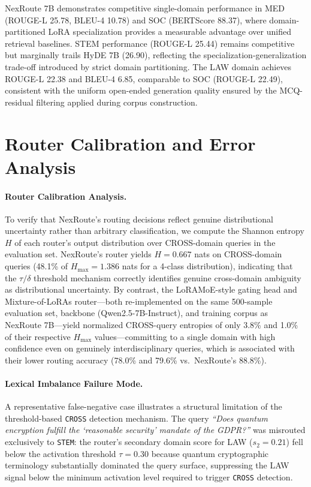 \documentclass[a4paper,fleql,doubleblind]{cas-sc}
\begin{document}
NexRoute 7B demonstrates competitive single-domain performance in MED
(ROUGE-L 25.78, BLEU-4 10.78) and SOC (BERTScore 88.37), where
domain-partitioned LoRA specialization provides a measurable advantage over
unified retrieval baselines. STEM performance (ROUGE-L 25.44) remains
competitive but marginally trails HyDE 7B (26.90), reflecting the
specialization-generalization trade-off introduced by strict domain
partitioning. The LAW domain achieves ROUGE-L 22.38 and BLEU-4 6.85,
comparable to SOC (ROUGE-L 22.49), consistent with the uniform open-ended
generation quality ensured by the MCQ-residual filtering applied during
corpus construction.

\section{Router Calibration and Error Analysis}
\label{supp:error_analysis}

\paragraph{Router Calibration Analysis.}
To verify that NexRoute's routing decisions reflect genuine distributional
uncertainty rather than arbitrary classification, we compute the Shannon
entropy $H$ of each router's output distribution over CROSS-domain
queries in the evaluation set.
NexRoute's router yields $H{=}0.667$ nats on CROSS-domain queries
(48.1\% of $H_{\max}{=}1.386$ nats for a 4-class distribution),
indicating that the $\tau/\delta$ threshold mechanism correctly identifies
genuine cross-domain ambiguity as distributional uncertainty.
By contrast, the LoRAMoE-style gating head and Mixture-of-LoRAs router---both
re-implemented on the same 500-sample evaluation set, backbone
(Qwen2.5-7B-Instruct), and training corpus as NexRoute 7B---yield
normalized CROSS-query entropies of only 3.8\% and 1.0\%
of their respective $H_{\max}$ values---committing to a single
domain with high confidence even on genuinely interdisciplinary
queries, which is associated with their lower routing accuracy
(78.0\% and 79.6\% vs.\ NexRoute's 88.8\%).

\paragraph{Lexical Imbalance Failure Mode.}
A representative false-negative case illustrates a structural limitation of the
threshold-based \texttt{CROSS} detection mechanism. The query \textit{``Does
quantum encryption fulfill the `reasonable security' mandate of the GDPR?''}
was misrouted exclusively to \texttt{STEM}: the router's secondary domain score
for LAW ($s_2 = 0.21$) fell below the activation threshold $\tau = 0.30$
because quantum cryptographic terminology
substantially dominated the query surface, suppressing the LAW signal below the
minimum activation level required to trigger \texttt{CROSS} detection.
\end{document}
